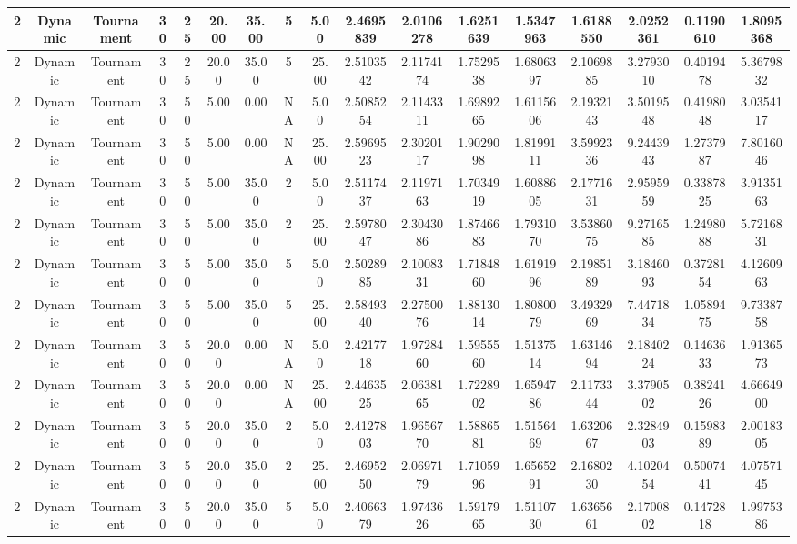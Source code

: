 \begin{longtable}{ | c | c | c | c | c | c | c | c | c | c | c | c | c | c | c | c | c | }
	\hline
	2	&	Dynamic	&	Tournament	&	30	&	25	&	20.00	&	35.00	&	5	&	5.00	&	2.4695839	&	2.0106278	&	1.6251639	&	1.5347963	&	1.6188550	&	2.0252361	&	0.1190610	&	1.8095368 \\
	\hline
	2	&	Dynamic	&	Tournament	&	30	&	25	&	20.00	&	35.00	&	5	&	25.00	&	2.5103542	&	2.1174174	&	1.7529538	&	1.6806397	&	2.1069885	&	3.2793010	&	0.4019478	&	5.3679832 \\
	\hline
	2	&	Dynamic	&	Tournament	&	30	&	50	&	5.00	&	0.00	&	NA	&	5.00	&	2.5085254	&	2.1143311	&	1.6989265	&	1.6115606	&	2.1932143	&	3.5019548	&	0.4198048	&	3.0354117 \\
	\hline
	2	&	Dynamic	&	Tournament	&	30	&	50	&	5.00	&	0.00	&	NA	&	25.00	&	2.5969523	&	2.3020117	&	1.9029098	&	1.8199111	&	3.5992336	&	9.2443943	&	1.2737987	&	7.8016046 \\
	\hline
	2	&	Dynamic	&	Tournament	&	30	&	50	&	5.00	&	35.00	&	2	&	5.00	&	2.5117437	&	2.1197163	&	1.7034919	&	1.6088605	&	2.1771631	&	2.9595959	&	0.3387825	&	3.9135163 \\
	\hline
	2	&	Dynamic	&	Tournament	&	30	&	50	&	5.00	&	35.00	&	2	&	25.00	&	2.5978047	&	2.3043086	&	1.8746683	&	1.7931070	&	3.5386075	&	9.2716585	&	1.2498088	&	5.7216831 \\
	\hline
	2	&	Dynamic	&	Tournament	&	30	&	50	&	5.00	&	35.00	&	5	&	5.00	&	2.5028985	&	2.1008331	&	1.7184860	&	1.6191996	&	2.1985189	&	3.1846093	&	0.3728154	&	4.1260963 \\
	\hline
	2	&	Dynamic	&	Tournament	&	30	&	50	&	5.00	&	35.00	&	5	&	25.00	&	2.5849340	&	2.2750076	&	1.8813014	&	1.8080079	&	3.4932969	&	7.4471834	&	1.0589475	&	9.7338758 \\
	\hline
	2	&	Dynamic	&	Tournament	&	30	&	50	&	20.00	&	0.00	&	NA	&	5.00	&	2.4217718	&	1.9728460	&	1.5955560	&	1.5137514	&	1.6314694	&	2.1840224	&	0.1463633	&	1.9136573 \\
	\hline
	2	&	Dynamic	&	Tournament	&	30	&	50	&	20.00	&	0.00	&	NA	&	25.00	&	2.4463525	&	2.0638165	&	1.7228902	&	1.6594786	&	2.1173344	&	3.3790502	&	0.3824126	&	4.6664900 \\
	\hline
	2	&	Dynamic	&	Tournament	&	30	&	50	&	20.00	&	35.00	&	2	&	5.00	&	2.4127803	&	1.9656770	&	1.5886581	&	1.5156469	&	1.6320667	&	2.3284903	&	0.1598389	&	2.0018305 \\
	\hline
	2	&	Dynamic	&	Tournament	&	30	&	50	&	20.00	&	35.00	&	2	&	25.00	&	2.4695250	&	2.0697179	&	1.7105996	&	1.6565291	&	2.1680230	&	4.1020454	&	0.5007441	&	4.0757145 \\
	\hline
	2	&	Dynamic	&	Tournament	&	30	&	50	&	20.00	&	35.00	&	5	&	5.00	&	2.4066379	&	1.9743626	&	1.5917965	&	1.5110730	&	1.6365661	&	2.1700802	&	0.1472818	&	1.9975386 \\

\end{longtable}
